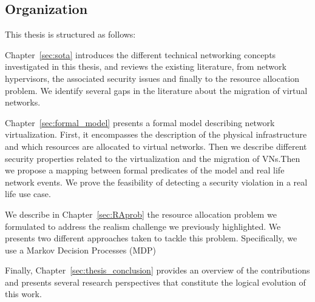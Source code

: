 
\subsection{Organization}
This thesis is structured as follows: 


Chapter~\ref{sec:sota} introduces the different technical networking concepts investigated in this thesis, and reviews the existing literature, from network hypervisors, the associated security issues and finally to the resource allocation problem. We identify several gaps in the literature about the migration of virtual networks.

Chapter~\ref{sec:formal_model} presents a formal model describing network virtualization. 
First, it encompasses the description of the physical infrastructure and which resources are allocated to virtual networks. Then we describe different security properties related to the virtualization and the migration of VNs.Then we propose a mapping between formal predicates of the model and real life network events. We prove the feasibility of detecting a security violation in a real life use case.

We describe in Chapter~\ref{sec:RAprob} the resource allocation problem we formulated to address the realism challenge we previously highlighted.
We presents two different approaches taken to tackle this problem.
Specifically, we use a Markov Decision Processes (MDP) 


Finally, Chapter~\ref{sec:thesis_conclusion} provides an overview of the contributions and presents several research perspectives that constitute the logical evolution of this work. 
